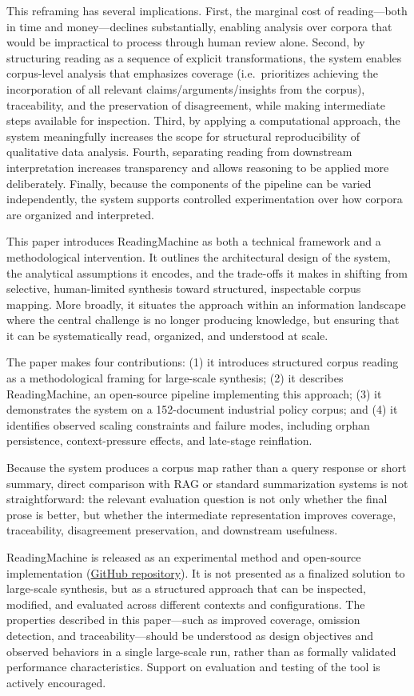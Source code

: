 \documentclass[
  11pt,
]{article}
\begin{document}
This reframing has several implications. First, the marginal cost of
reading---both in time and money---declines substantially, enabling
analysis over corpora that would be impractical to process through human
review alone. Second, by structuring reading as a sequence of explicit
transformations, the system enables corpus-level analysis that
emphasizes coverage (i.e.~prioritizes achieving the incorporation of all
relevant claims/arguments/insights from the corpus), traceability, and
the preservation of disagreement, while making intermediate steps
available for inspection. Third, by applying a computational approach,
the system meaningfully increases the scope for structural
reproducibility of qualitative data analysis. Fourth, separating reading
from downstream interpretation increases transparency and allows
reasoning to be applied more deliberately. Finally, because the
components of the pipeline can be varied independently, the system
supports controlled experimentation over how corpora are organized and
interpreted.

This paper introduces ReadingMachine as both a technical framework
and a methodological intervention. It outlines the architectural design
of the system, the analytical assumptions it encodes, and the trade-offs
it makes in shifting from selective, human-limited synthesis toward
structured, inspectable corpus mapping. More broadly, it situates the
approach within an information landscape where the central challenge is
no longer producing knowledge, but ensuring that it can be
systematically read, organized, and understood at scale.

The paper makes four contributions: (1) it introduces structured corpus
reading as a methodological framing for large-scale synthesis; (2) it
describes ReadingMachine, an open-source pipeline implementing this
approach; (3) it demonstrates the system on a 152-document industrial
policy corpus; and (4) it identifies observed scaling constraints and
failure modes, including orphan persistence, context-pressure effects,
and late-stage reinflation.

Because the system produces a corpus map rather than a query response 
or short summary, direct comparison with RAG or standard summarization 
systems is not straightforward: the relevant evaluation question is not 
only whether the final prose is better, but whether the intermediate 
representation improves coverage, traceability, disagreement preservation, 
and downstream usefulness.

ReadingMachine is released as an experimental method and open-source implementation
(\href{https://github.com/morrisseyj/ReadingMachine/}{GitHub repository}). It is
not presented as a finalized solution to large-scale synthesis, but as a
structured approach that can be inspected, modified, and evaluated
across different contexts and configurations. The properties described
in this paper---such as improved coverage, omission detection, and
traceability---should be understood as design objectives and observed
behaviors in a single large-scale run, rather than as formally validated
performance characteristics. Support on evaluation and testing of the
tool is actively encouraged.
\end{document}
